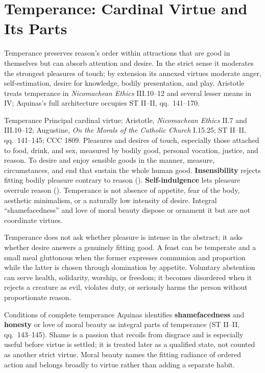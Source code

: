\section{Temperance: Cardinal Virtue and Its Parts}
\label{sec:temperance}

Temperance preserves reason's order within attractions that are good in themselves but can absorb attention and desire. In the strict sense it moderates the strongest pleasures of touch; by extension its annexed virtues moderate anger, self-estimation, desire for knowledge, bodily presentation, and play. Aristotle treats temperance in \emph{Nicomachean Ethics} III.10--12 and several lesser means in IV; Aquinas's full architecture occupies ST II--II, qq.~141--170.


\virtuedossier
  {Temperance}
  {Principal cardinal virtue; Aristotle, \emph{Nicomachean Ethics} II.7 and III.10--12; Augustine, \emph{On the Morals of the Catholic Church} I.15.25; ST II--II, qq.~141--145; CCC 1809.}
  {Pleasures and desires of touch, especially those attached to food, drink, and sex, measured by bodily good, personal vocation, justice, and reason.}
  {To desire and enjoy sensible goods in the manner, measure, circumstances, and end that sustain the whole human good.}
  {\textbf{Insensibility} rejects fitting bodily pleasure contrary to reason ().}
  {\textbf{Self-indulgence} lets pleasure overrule reason ().}
  {Temperance is not absence of appetite, fear of the body, aesthetic minimalism, or a naturally low intensity of desire. Integral ``shamefacedness'' and love of moral beauty dispose or ornament it but are not coordinate virtues.}

Temperance does not ask whether pleasure is intense in the abstract; it asks whether desire answers a genuinely fitting good. A feast can be temperate and a small meal gluttonous when the former expresses communion and proportion while the latter is chosen through domination by appetite. Voluntary abstention can serve health, solidarity, worship, or freedom; it becomes disordered when it rejects a creature as evil, violates duty, or seriously harms the person without proportionate reason.


\begin{studybox}{Conditions of complete temperance}
Aquinas identifies \textbf{shamefacedness} and \textbf{honesty} or love of moral beauty as integral parts of temperance (ST II--II, qq.~143--145). Shame is a passion that recoils from disgrace and is especially useful before virtue is settled; it is treated later as a qualified state, not counted as another strict virtue. Moral beauty names the fitting radiance of ordered action and belongs broadly to virtue rather than adding a separate habit.
\end{studybox}


